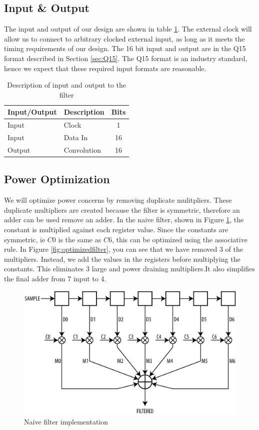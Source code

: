 \subsection{Input \& Output}
The input and output of our design are shown in table \ref{table:inputoutput}.  The external clock will allow us to connect to arbitrary clocked external input, as long as it meets the timing requirements of our design.  The 16 bit input and output are in the Q15 format described in Section \ref{sec:Q15}.  The Q15 format is an industry standard, hence we expect that these required input formats are reasonable.

\begin{table}[ht]
\centering
\begin{tabular}{l | l | c}
\hline
Input/Output & Description & Bits \\
\hline \hline
Input & Clock & 1 \\
Input & Data In & 16 \\
Output & Convolution & 16 \\
\end{tabular}
\caption{Description of input and output to the filter}
\label{table:inputoutput}
\end{table}



\subsection{Power Optimization}

We will optimize power concerns by removing duplicate mulitpliers.  These duplicate multipliers are created because the filter is symmetric, therefore an adder can be used remove an adder.  In the naive filter, shown in Figure \ref{fig:naivefilter}, the constant is multiplied against each register value.  Since the constants are symmetric, ie $C0$ is the same as $C6$, this can be optimized using the associative rule.  In Figure \ref{fig:optimizedfilter}, you can see that we have removed 3 of the multipliers.  Instead, we add the values in the registers before multiplying the constants.  This eliminates 3 large and power draining multipliers.It also simplifies the final adder from 7 input to 4.


\begin{figure}[ht]
\centering
\includegraphics[width=5in]{images/filter_normal}
\caption{Naive filter implementation}
\label{fig:naivefilter}
\end{figure}

